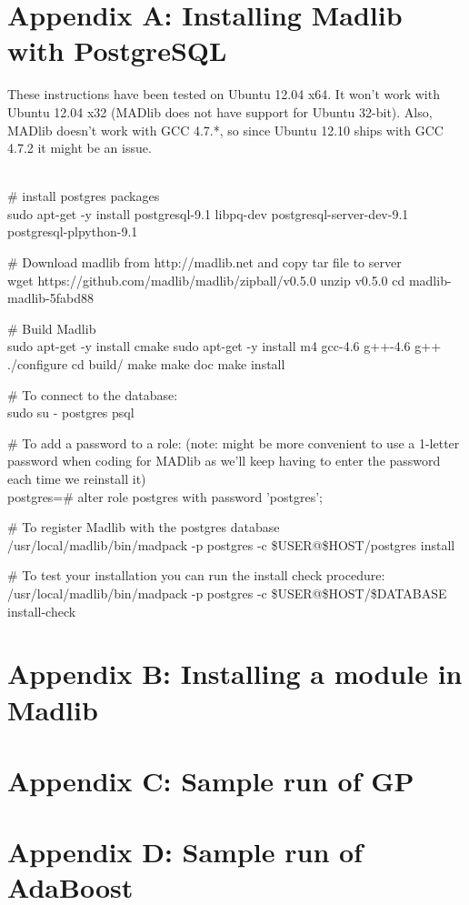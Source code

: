 
\section*{Appendix A: Installing Madlib with PostgreSQL}


These instructions have been tested on Ubuntu 12.04 x64. It won't work with Ubuntu 12.04 x32 (MADlib does not have support for Ubuntu 32-bit). Also, MADlib doesn't work with GCC 4.7.*, so since Ubuntu 12.10 ships with GCC 4.7.2 it might be an issue.

~~\\
\# install postgres packages \\
sudo apt-get -y install postgresql-9.1 libpq-dev postgresql-server-dev-9.1 postgresql-plpython-9.1

\# Download madlib from http://madlib.net and copy tar file to server \\
wget https://github.com/madlib/madlib/zipball/v0.5.0
unzip v0.5.0
cd madlib-madlib-5fabd88 

\# Build Madlib \\
sudo apt-get -y install cmake
sudo apt-get -y install m4 gcc-4.6 g++-4.6 g++
./configure
cd build/
make
make doc
make install

\# To connect to the database: \\
sudo su - postgres
psql

\# To add a password to a role: (note: might be more convenient to use a 1-letter password when coding for MADlib as we'll keep having to enter the password each time we reinstall it) \\
postgres=\# alter role postgres with password 'postgres';

\# To register Madlib with the postgres database \\
/usr/local/madlib/bin/madpack -p postgres -c \$USER@\$HOST/postgres install

\# To test your installation you can run the install check procedure: \\
/usr/local/madlib/bin/madpack -p postgres -c \$USER@\$HOST/\$DATABASE install-check


\section*{Appendix B: Installing a module in Madlib}


\section*{Appendix C: Sample run of GP}


\section*{Appendix D: Sample run of AdaBoost}